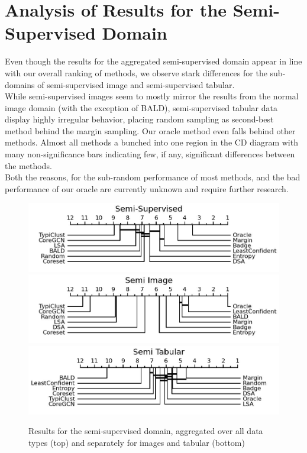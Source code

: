 \documentclass[]{article}
\begin{document}
\section{Analysis of Results for the Semi-Supervised Domain}\label{app:semi_sup_analysis}
Even though the results for the aggregated semi-supervised domain appear in line with our overall ranking of methods, we observe stark differences for the sub-domains of semi-supervised image and semi-supervised tabular. \\
While semi-supervised images seem to mostly mirror the results from the normal image domain (with the exception of BALD), semi-supervised tabular data display highly irregular behavior, placing random sampling as second-best method behind the margin sampling.
Our oracle method even falls behind other methods.
Almost all methods a bunched into one region in the CD diagram with many non-significance bars indicating few, if any, significant differences between the methods. \\
Both the reasons, for the sub-random performance of most methods, and the bad performance of our oracle are currently unknown and require further research.
\begin{figure}[H]
	\centering
	\caption{Results for the semi-supervised domain, aggregated over all data types (top) and separately for images and tabular (bottom)}
	\includegraphics[width=0.6\linewidth]{img/macro_enc.jpg}
	\includegraphics[width=0.49\linewidth]{img/macro_enc_img.jpg}
	\includegraphics[width=0.49\linewidth]{img/macro_enc_tabular.jpg}
\end{figure}
\end{document}
